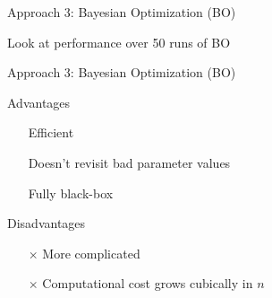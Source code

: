 \documentclass{beamer}
\begin{document}
\begin{frame}{Approach 3: Bayesian Optimization (BO)}
	\begin{block}{}
		Look at performance over 50 runs of BO
		
		\begin{figure}[h]
			\begin{center}
			\end{center}
		\end{figure}
	\end{block}
\end{frame}
\begin{frame}{Approach 3: Bayesian Optimization (BO)}
		\begin{block}{Advantages}
		\begin{itemize}
			\item[\checkmark] Efficient 
			\item[\checkmark] Doesn't revisit bad parameter values
			\item[\checkmark] Fully black-box
		\end{itemize}
	\end{block}
	\begin{block}{Disadvantages}
		\begin{itemize}
			\item[$\times$] More complicated
			\item[$\times$] Computational cost grows cubically in $n$
		\end{itemize}
	\end{block}
\end{frame}
\end{document}
